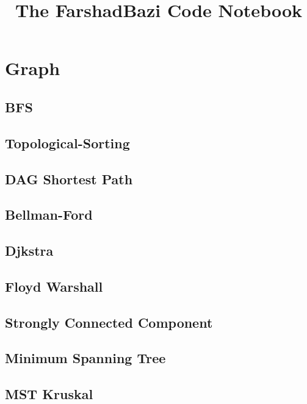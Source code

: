 \documentclass[8pt , a4paper]{report}
\begin{document}
\title{The FarshadBazi Code Notebook}
\maketitle
  \tableofcontents
\newpage
\section{Graph}

\subsection{BFS}


\subsection{Topological-Sorting}


\subsection{DAG Shortest Path}


\subsection{Bellman-Ford}


\subsection{Djkstra}


\subsection{Floyd Warshall}


\subsection{Strongly Connected Component}


\subsection{Minimum Spanning Tree}


\subsection{MST Kruskal}

\end{document}
